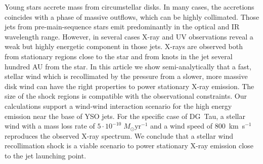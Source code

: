 Young stars accrete mass from circumstellar disks. In many cases, the accretions coincides with a phase of massive outflows, which can be highly collimated. Those jets from pre-main-sequence stars emit predominantly in the optical and IR wavelength range. However, in several cases X-ray and UV observations reveal a weak but highly energetic component in those jets. X-rays are observed both from stationary regions close to the star and from knots in the jet several hundred AU from the star. 
In this article we show semi-analytically that a fast, stellar wind which is recollimated by the pressure from a slower, more massive disk wind can have the right properties to power stationary X-ray emission. The size of the shock regions is compatible with the observational constraints. Our calculations support a wind-wind interaction scenario for the high energy emission near the base of YSO jets. For the specific case of DG~Tau, a stellar wind with a mass loss rate of $5\cdot10^{-10}\;M_{\odot}\mathrm{ yr}^{-1}$ and a wind speed of 800~km~s$^{-1}$ reproduces the observed X-ray spectrum.
We conclude that a stellar wind recollimation shock is a viable scenario to power stationary X-ray emission close to the jet launching point.

